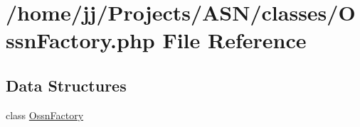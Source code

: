 \hypertarget{_ossn_factory_8php}{}\section{/home/jj/\+Projects/\+A\+S\+N/classes/\+Ossn\+Factory.php File Reference}
\label{_ossn_factory_8php}
\subsection*{Data Structures}
\begin{DoxyCompactItemize}
\item 
class \hyperlink{class_ossn_factory}{Ossn\+Factory}
\end{DoxyCompactItemize}
